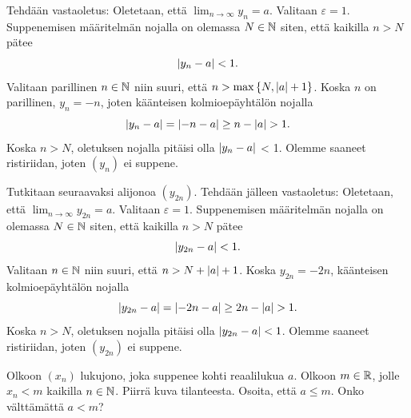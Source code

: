 \documentclass[11pt,a4paper]{amsart}
\begin{document}
\begin{solution}
  Tehdään vastaoletus: Oletetaan, että \(\lim_{n \to \infty} y_n = a\).
  Valitaan \(\varepsilon = 1\). Suppenemisen määritelmän nojalla on olemassa
  \(N \in \mathbb{N}\) siten, että kaikilla \(n > N\) pätee
  \[
    \lvert y_n - a\rvert < 1.
  \]
  Valitaan parillinen \(n \in \mathbb{N}\) niin suuri, että \(n > \max\left\lbrace N,
  \lvert a\rvert + 1\right\rbrace\).
  Koska \(n\) on parillinen, \(y_n = -n\), joten käänteisen
  kolmioepäyhtälön nojalla
  \[
    \lvert y_n - a\rvert = \lvert-n - a\rvert \geq n - \lvert a\rvert > 1.
  \]
  Koska \(n > N\), oletuksen nojalla pitäisi olla \(\lvert y_{n} - a\rvert\) < 1.
  Olemme saaneet ristiriidan, joten \((y_n)\) ei suppene.

  Tutkitaan seuraavaksi alijonoa \((y_{2n})\). Tehdään jälleen vastaoletus:
  Oletetaan, että \(\lim_{n \to \infty} y_{2n} = a\). Valitaan
  \(\varepsilon = 1\). Suppenemisen määritelmän nojalla on olemassa
  \(N \in \mathbb{N}\) siten, että kaikilla \(n > N\) pätee
  \[
    \lvert y_{2n} - a\rvert < 1.
  \]
  Valitaan \(n \in \mathbb{N}\) niin suuri, että \(n > N + \lvert a\rvert + 1\).
  Koska \(y_{2n} = -2n\), käänteisen kolmioepäyhtälön nojalla
  \[
    \lvert y_{2n} - a\rvert = \lvert-2n - a\rvert \geq 2n - \lvert a\rvert > 1.
  \]
  Koska \(n > N\), oletuksen nojalla pitäisi olla \(\lvert y_{2n} - a\rvert < 1\).
  Olemme saaneet ristiriidan, joten \((y_{2n})\) ei suppene.
\end{solution}

\begin{exercise}
  Olkoon \((x_n)\) lukujono, joka suppenee kohti reaalilukua \(a\). Olkoon
  \(m \in \mathbb{R}\), jolle \(x_n < m\) kaikilla \(n \in \mathbb{N}\). Piirrä
  kuva tilanteesta. Osoita, että \(a \leq m\). Onko välttämättä
  \(a < m\)?
\end{exercise}
\end{document}
